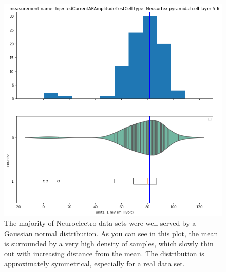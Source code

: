 \begin{figure} 
    \begin{center}
   \includegraphics[scale=0.45]{figures/mean_well_served.png}
   \caption[Neuroelectro data set well served by normal distribution 1]{The majority of Neuroelectro data sets were well served by a Gaussian normal distribution. As you can see in this plot, the mean is surrounded by a very high density of samples, which slowly thin out with increasing distance from the mean. The distribution is approximately symmetrical, especially for a real data set. 
   }
    \end{center}
\end{figure}   


